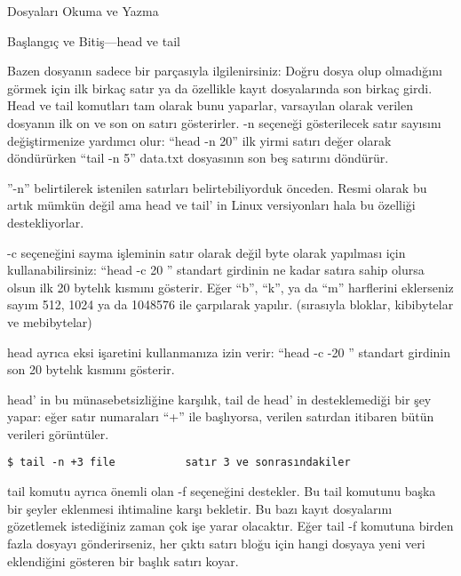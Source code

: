 \begin{section}{Dosyaları Okuma ve Yazma}
\begin{subsection}{Başlangıç ve Bitiş—head ve tail}

Bazen dosyanın sadece bir parçasıyla ilgilenirsiniz: Doğru dosya olup olmadığını görmek için ilk birkaç satır ya da özellikle kayıt dosyalarında son birkaç girdi. Head ve tail komutları tam olarak bunu yaparlar, varsayılan olarak verilen dosyanın ilk on ve son on satırı gösterirler. -n seçeneği gösterilecek satır sayısını değiştirmenize yardımcı olur: “head -n 20” ilk yirmi satırı değer olarak döndürürken “tail -n 5” data.txt dosyasının son beş satırını döndürür.

”-n” belirtilerek istenilen satırları belirtebiliyorduk önceden. Resmi olarak bu artık mümkün değil ama head ve tail' in Linux versiyonları hala bu özelliği destekliyorlar.

-c seçeneğini sayma işleminin satır olarak değil byte olarak yapılması için kullanabilirsiniz: 
“head -c 20 ” standart girdinin ne kadar satıra sahip olursa olsun ilk 20 bytelık kısmını gösterir. Eğer “b”, “k”, ya da “m” harflerini eklerseniz sayım 512, 1024 ya da 1048576 ile çarpılarak yapılır. (sırasıyla bloklar, kibibytelar ve mebibytelar)

head ayrıca eksi işaretini kullanmanıza izin verir: “head -c -20 ” standart girdinin son 20 bytelık kısmını gösterir.

head' in bu münasebetsizliğine karşılık, tail de head' in desteklemediği bir şey yapar: eğer satır numaraları “+” ile başlıyorsa, verilen satırdan itibaren bütün verileri görüntüler.
\begin{verbatim}
$ tail -n +3 file           satır 3 ve sonrasındakiler
\end{verbatim}

tail komutu ayrıca önemli olan -f seçeneğini destekler. Bu tail komutunu başka bir şeyler eklenmesi ihtimaline karşı bekletir. Bu bazı kayıt dosyalarını gözetlemek istediğiniz zaman çok işe yarar olacaktır. Eğer tail -f komutuna birden fazla dosyayı gönderirseniz, her çıktı satırı bloğu için hangi dosyaya yeni veri eklendiğini gösteren bir başlık satırı koyar.


\end{subsection}
\end{section}
